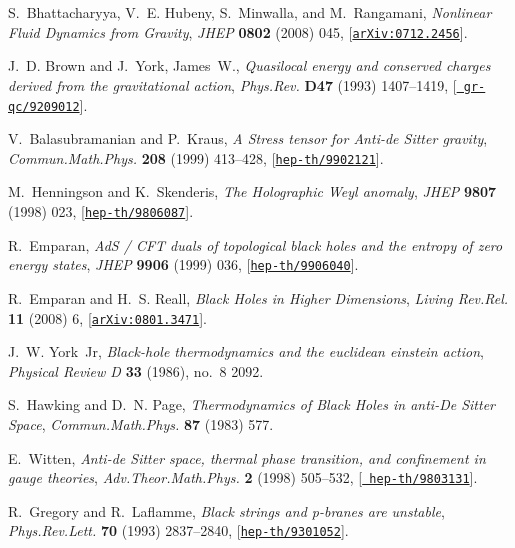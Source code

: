 \documentclass[12pt]{article}
\begin{document}
\begin{thebibliography}{100}
S.~Bhattacharyya, V.~E. Hubeny, S.~Minwalla, and M.~Rangamani, {\it {Nonlinear
  Fluid Dynamics from Gravity}},  {\em JHEP} {\bf 0802} (2008) 045,
  [\href{http://xxx.lanl.gov/abs/0712.2456}{{\tt arXiv:0712.2456}}].

J.~D. Brown and J.~York, James~W., {\it {Quasilocal energy and conserved
  charges derived from the gravitational action}},  {\em Phys.Rev.} {\bf D47}
  (1993) 1407--1419, [\href{http://xxx.lanl.gov/abs/gr-qc/9209012}{{\tt
  gr-qc/9209012}}].

V.~Balasubramanian and P.~Kraus, {\it {A Stress tensor for Anti-de Sitter
  gravity}},  {\em Commun.Math.Phys.} {\bf 208} (1999) 413--428,
  [\href{http://xxx.lanl.gov/abs/hep-th/9902121}{{\tt hep-th/9902121}}].

M.~Henningson and K.~Skenderis, {\it {The Holographic Weyl anomaly}},  {\em
  JHEP} {\bf 9807} (1998) 023,
  [\href{http://xxx.lanl.gov/abs/hep-th/9806087}{{\tt hep-th/9806087}}].

R.~Emparan, {\it {AdS / CFT duals of topological black holes and the entropy of
  zero energy states}},  {\em JHEP} {\bf 9906} (1999) 036,
  [\href{http://xxx.lanl.gov/abs/hep-th/9906040}{{\tt hep-th/9906040}}].

R.~Emparan and H.~S. Reall, {\it {Black Holes in Higher Dimensions}},  {\em
  Living Rev.Rel.} {\bf 11} (2008) 6,
  [\href{http://xxx.lanl.gov/abs/0801.3471}{{\tt arXiv:0801.3471}}].

J.~W. York~Jr, {\it Black-hole thermodynamics and the euclidean einstein
  action},  {\em Physical Review D} {\bf 33} (1986), no.~8 2092.

S.~Hawking and D.~N. Page, {\it {Thermodynamics of Black Holes in anti-De
  Sitter Space}},  {\em Commun.Math.Phys.} {\bf 87} (1983) 577.

E.~Witten, {\it {Anti-de Sitter space, thermal phase transition, and
  confinement in gauge theories}},  {\em Adv.Theor.Math.Phys.} {\bf 2} (1998)
  505--532, [\href{http://xxx.lanl.gov/abs/hep-th/9803131}{{\tt
  hep-th/9803131}}].

R.~Gregory and R.~Laflamme, {\it {Black strings and p-branes are unstable}},
  {\em Phys.Rev.Lett.} {\bf 70} (1993) 2837--2840,
  [\href{http://xxx.lanl.gov/abs/hep-th/9301052}{{\tt hep-th/9301052}}].


\end{thebibliography}
\end{document}
